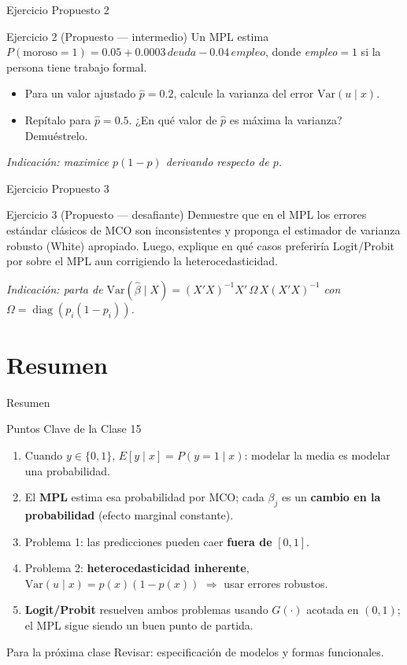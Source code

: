 \documentclass{beamer}
\begin{document}
\begin{frame}{Ejercicio Propuesto 2}
\begin{block}{Ejercicio 2 (Propuesto — intermedio)}
Un MPL estima $P(\text{moroso}=1)=0.05+0.0003\,deuda - 0.04\,empleo$, donde \textit{empleo}$=1$ si la persona tiene trabajo formal.
\begin{itemize}
    \item Para un valor ajustado $\hat p=0.2$, calcule la varianza del error $\text{Var}(u\mid x)$.
    \item Repítalo para $\hat p=0.5$. ¿En qué valor de $\hat p$ es máxima la varianza? Demuéstrelo.
\end{itemize}
\end{block}
{\small \textit{Indicación: maximice $p(1-p)$ derivando respecto de $p$.}}
\end{frame}

\begin{frame}{Ejercicio Propuesto 3}
\begin{block}{Ejercicio 3 (Propuesto — desafiante)}
Demuestre que en el MPL los errores estándar clásicos de MCO son inconsistentes y proponga el estimador de varianza robusto (White) apropiado. Luego, explique en qué casos preferiría Logit/Probit por sobre el MPL aun corrigiendo la heterocedasticidad.
\end{block}
{\small \textit{Indicación: parta de $\text{Var}(\hat\beta\mid X)=(X'X)^{-1}X'\,\Omega\,X(X'X)^{-1}$ con $\Omega=\operatorname{diag}(p_i(1-p_i))$.}}
\end{frame}

\section{Resumen}

\begin{frame}{Resumen}

\begin{block}{Puntos Clave de la Clase 15}
\begin{enumerate}
    \item Cuando $y\in\{0,1\}$, $E[y\mid x]=P(y=1\mid x)$: modelar la media es modelar una probabilidad.
    \item El \textbf{MPL} estima esa probabilidad por MCO; cada $\beta_j$ es un \textbf{cambio en la probabilidad} (efecto marginal constante).
    \item Problema 1: las predicciones pueden caer \textbf{fuera de} $[0,1]$.
    \item Problema 2: \textbf{heterocedasticidad inherente}, $\text{Var}(u\mid x)=p(x)(1-p(x))$ $\Rightarrow$ usar errores robustos.
    \item \textbf{Logit/Probit} resuelven ambos problemas usando $G(\cdot)$ acotada en $(0,1)$; el MPL sigue siendo un buen punto de partida.
\end{enumerate}
\end{block}

\begin{alertblock}{Para la próxima clase}
Revisar: especificación de modelos y formas funcionales.
\end{alertblock}

\end{frame}
\end{document}
